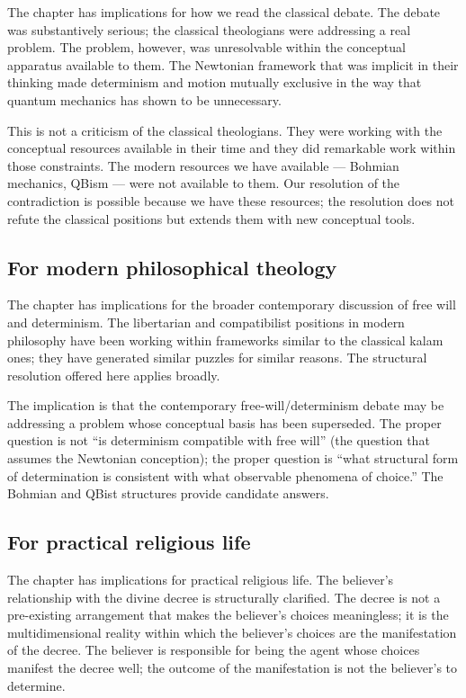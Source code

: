 The chapter has implications for how we read the classical
 debate. The debate was substantively serious; the
classical theologians were addressing a real problem. The
problem, however, was unresolvable within the conceptual
apparatus available to them. The Newtonian framework that was
implicit in their thinking made determinism and motion mutually
exclusive in the way that quantum mechanics has shown to be
unnecessary.

This is not a criticism of the classical theologians. They were
working with the conceptual resources available in their time and
they did remarkable work within those constraints. The modern
resources we have available --- Bohmian mechanics, QBism --- were
not available to them. Our resolution of the contradiction is
possible because we have these resources; the resolution does
not refute the classical positions but extends them with new
conceptual tools.

\subsection{For modern philosophical theology}

The chapter has implications for the broader contemporary
discussion of free will and determinism. The libertarian and
compatibilist positions in modern philosophy have been working
within frameworks similar to the classical kalam ones; they have
generated similar puzzles for similar reasons. The structural
resolution offered here applies broadly.

The implication is that the contemporary free-will/determinism
debate may be addressing a problem whose conceptual basis has
been superseded. The proper question is not ``is determinism
compatible with free will'' (the question that assumes the
Newtonian conception); the proper question is ``what structural
form of determination is consistent with what observable phenomena
of choice.'' The Bohmian and QBist structures provide candidate
answers.

\subsection{For practical religious life}

The chapter has implications for practical religious life. The
believer's relationship with the divine decree is structurally
clarified. The decree is not a pre-existing arrangement that
makes the believer's choices meaningless; it is the
multidimensional reality within which the believer's choices are
the manifestation of the decree. The believer is responsible for
being the agent whose choices manifest the decree well; the
outcome of the manifestation is not the believer's to determine.

